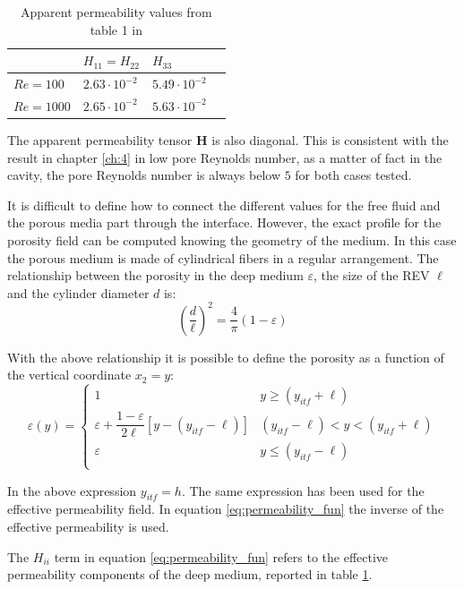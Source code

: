 \begin{table}[h]
	\centering
	\begin{tabular}{ l | l |  l   l   }
		& $H_{11} = H_{22}$ & $H_{33}$ \\ 
		\hline
		\hline
		$Re=100$ & $2.63 \cdot 10^{-2}$ & $5.49 \cdot 10^{-2}$ \\ 
		$Re=1000$ & $2.65 \cdot 10^{-2}$ & $5.63 \cdot 10^{-2}$
	\end{tabular}
	\caption{Apparent permeability values from table 1 in \citet{zampogna2016fluid}}
	\label{tab:H}
\end{table}

The apparent permeability tensor $\mathbf{H}$ is also diagonal. This is consistent with the result in chapter \ref{ch:4} in low pore Reynolds number, as a matter of fact in the cavity, the pore Reynolds number is always below $5$ for both cases tested.

It is difficult to define how to connect the different values for the free fluid and the porous media part through the interface.
However, the exact profile for the porosity field can be computed knowing the geometry of the medium. In this case the porous medium is made of cylindrical fibers in a regular arrangement. The relationship between the porosity in the deep medium $\varepsilon$, the size of the REV $\ell$ and the cylinder diameter $d$ is:
$$
\left( \dfrac{d}{\ell} \right)^2 = \dfrac{4}{\pi} \left(1 - \varepsilon \right)
$$

With the above relationship it is possible to define the porosity as a function of the vertical coordinate $x_2 = y$:
\begin{equation}
\varepsilon(y) = 
\begin{cases}
1 & y\geqslant(y_{itf}+\ell) \\
\varepsilon +\dfrac{1-\varepsilon}{2\ell}\left[y -\left(y_{itf} -\ell\right)\right] &  (y_{itf}-\ell)<y<(y_{itf}+\ell)\\
\varepsilon &y\leqslant(y_{itf}-\ell) \\
\end{cases}
\label{eq:porsitity_fun}
\end{equation}

In the above expression $y_{itf} = h$. The same expression has been used for the effective permeability field. In equation \eqref{eq:permeability_fun} the inverse of the effective permeability is used.

The ${H_{ii}}$ term in equation \eqref{eq:permeability_fun} refers to the effective permeability components of the deep medium, reported in table \ref{tab:H}.

